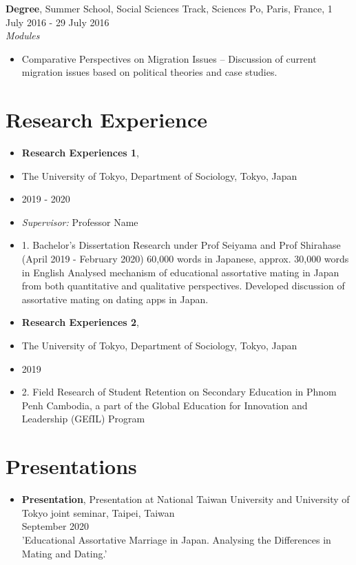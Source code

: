 \documentclass[11pt, a4paper]{article}
\begin{document}
\textbf{Degree}, Summer School, Social Sciences Track, Sciences Po, Paris, France, 1 July 2016 - 29 July 2016 \\
\textit{Modules} \\
\begin{itemize}[leftmargin=*]
    \item  Comparative Perspectives on Migration Issues – Discussion of current migration issues based on political theories and case studies. \\
\end{itemize}

\section*{Research Experience}
\begin{itemize}[leftmargin=*]
    \item \textbf{Research Experiences 1}, \\
    \item The University of Tokyo, Department of Sociology, Tokyo, Japan \\
    \item 2019 - 2020 \\
    \item \textit{Supervisor:} Professor Name \\
    \item 1. Bachelor’s Dissertation Research under Prof Seiyama and Prof Shirahase (April 2019 - February 2020)
    60,000 words in Japanese, approx. 30,000 words in English
    Analysed mechanism of educational assortative mating in Japan from both quantitative and qualitative perspectives.
    Developed discussion of assortative mating on dating apps in Japan.
    \item \textbf{Research Experiences 2}, \\
    \item The University of Tokyo, Department of Sociology, Tokyo, Japan \\
    \item 2019 \\
    \item 2. Field Research of Student Retention on Secondary Education in Phnom Penh Cambodia, a part of the Global Education for Innovation and Leadership (GEfIL) Program
\end{itemize}

\section*{Presentations}
\begin{itemize}[leftmargin=*]
    \item \textbf{Presentation},  Presentation at National Taiwan University and University of Tokyo joint seminar, Taipei, Taiwan \\
    September 2020 \\
    'Educational Assortative Marriage in Japan.  Analysing the Differences in Mating and Dating.'
\end{itemize}
\end{document}
